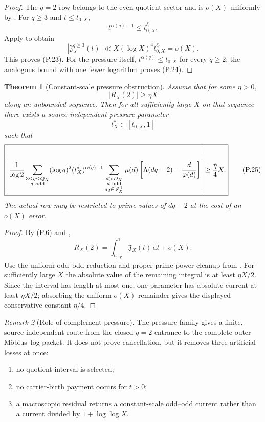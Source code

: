 \documentclass[11pt]{article}
\newtheorem{theorem}{Theorem}[section]
\theoremstyle{definition}
\theoremstyle{remark}
\newtheorem{remark}[theorem]{Remark}
\newcommand{\dd}{\mathrm d}
\begin{document}
\begin{proof}
The $q=2$ row belongs to the even-quotient sector and is $o(X)$ uniformly by
.  For $q\ge3$ and $t\le t_{0,X}$,
\[
 t^{\alpha(q)-1}
 \le t_{0,X}^{\delta_0}.
\]
Apply  to obtain
\[
 |\mathfrak J_X^{q\ge3}(t)|
 \ll X(\log X)^4t_{0,X}^{\delta_0}
 =o(X).
\]
This proves \textup{(P.23)}.  For the pressure itself,
$t^{\alpha(q)}\le t_{0,X}$ for every $q\ge2$; the analogous bound with one
fewer logarithm proves \textup{(P.24)}.
\end{proof}

\begin{theorem}[Constant-scale pressure obstruction]
\label{thm:affpress-pressure-obstruction}
Assume that for some $\eta>0$,
\[
 |R_X(2)|\ge\eta X
\]
along an unbounded sequence.  Then for all sufficiently large $X$ on that
sequence there exists a source-independent pressure parameter
\[
 t_X^*\in[t_{0,X},1]
\]
such that
\begin{equation}
 \label{eq:affpress-pressure-obstruction}
 \boxed{
 \left|
 \frac1{\log2}
 \sum_{\substack{3\le q\le Q_X\\q\ {\rm odd}}}
 (\log q)^2(t_X^*)^{\alpha(q)-1}
 \sum_{\substack{d>D_X\\d\ {\rm odd}\\dq\in\mathscr I_X^+}}
 \mu(d)
 \left[
  \Lambda(dq-2)-\frac d{\varphi(d)}
 \right]
 \right|
 \ge\frac\eta4X.}
 \tag{P.25}
\end{equation}
The actual row may be restricted to prime values of $dq-2$ at the cost of an
$o(X)$ error.
\end{theorem}

\begin{proof}
By \textup{(P.6)} and ,
\[
 R_X(2)
 =\int_{t_{0,X}}^1\mathfrak J_X(t)\,\dd t+o(X).
\]
Use the uniform odd--odd reduction and proper-prime-power cleanup from
.  For sufficiently large $X$ the absolute value
of the remaining integral is at least $\eta X/2$.  Since the interval has
length at most one, one parameter has absolute current at least $\eta X/2$;
absorbing the uniform $o(X)$ remainder gives the displayed conservative
constant $\eta/4$.
\end{proof}

\begin{remark}[Role of complement pressure]
The pressure family gives a finite, source-independent route from the closed
$q=2$ entrance to the complete outer M\"obius--log packet.  It does not prove cancellation,
but it removes three artificial losses at once:
\begin{enumerate}[label=\textup{(\roman*)},leftmargin=2.8em]
\item no quotient interval is selected;
\item no carrier-birth payment occurs for $t>0$;
\item a macroscopic residual returns a constant-scale odd--odd current rather
      than a current divided by $1+\log\log X$.
\end{enumerate}
\end{remark}
\end{document}
